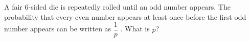 A fair $6$-sided die is repeatedly rolled until an odd number appears. The probability that every even number appears at least once before the first odd number appears can be written as $\dfrac{1}{p}$ . What is $p$?
